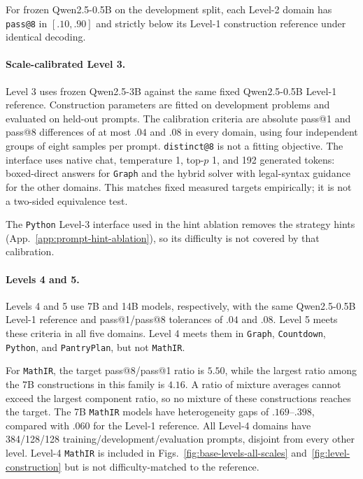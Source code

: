 \documentclass{article}
\makeatletter
\newcommand{\1}{\mathbf 1}
\newcommand{\distk}{\texttt{distinct@8}}
\theoremstyle{remark}
\theoremstyle{definition}
\theoremstyle{plain}
\makeatother
\begin{document}
For frozen Qwen2.5-0.5B on the development split, each Level-2 domain has
\texttt{pass@8} in $[.10,.90]$ and strictly below its Level-1 construction
reference under identical decoding.

\paragraph{Scale-calibrated Level 3.}
Level 3 uses frozen Qwen2.5-3B against the same fixed Qwen2.5-0.5B Level-1
reference. Construction parameters are fitted on development problems and evaluated on
held-out prompts. The calibration criteria are absolute pass@1 and pass@8
differences of at most $.04$ and $.08$ in every domain, using four independent
groups of eight samples per prompt. \distk{} is not a fitting objective. The
interface uses native chat, temperature 1, top-$p$ 1, and 192 generated
tokens: boxed-direct answers for \texttt{Graph} and the hybrid solver with
legal-syntax guidance for the other domains. This matches fixed measured
targets empirically; it is not a two-sided equivalence test.

The \texttt{Python} Level-3 interface used in the hint ablation removes the strategy
hints (App.~\ref{app:prompt-hint-ablation}), so its difficulty is not
covered by that calibration.

\paragraph{Levels 4 and 5.}
Levels 4 and 5 use 7B and 14B models, respectively, with the same
Qwen2.5-0.5B Level-1 reference and pass@1/pass@8 tolerances of $.04$ and $.08$.
Level 5 meets these criteria in all five domains. Level 4 meets them in \texttt{Graph},
\texttt{Countdown}, \texttt{Python}, and \texttt{PantryPlan}, but not \texttt{MathIR}.

For \texttt{MathIR}, the target pass@8/pass@1 ratio is $5.50$, while the largest ratio
among the 7B constructions in this family is $4.16$. A ratio of mixture
averages cannot exceed the largest component ratio, so no mixture of these
constructions reaches the target. The 7B \texttt{MathIR} models have heterogeneity
gaps of $.169$--$.398$, compared with $.060$ for the Level-1 reference. All
Level-4 domains have 384/128/128 training/development/evaluation prompts,
disjoint from every other level. Level-4 \texttt{MathIR} is included in
Figs.~\ref{fig:base-levels-all-scales} and~\ref{fig:level-construction}
but is not difficulty-matched to the reference.
\end{document}
